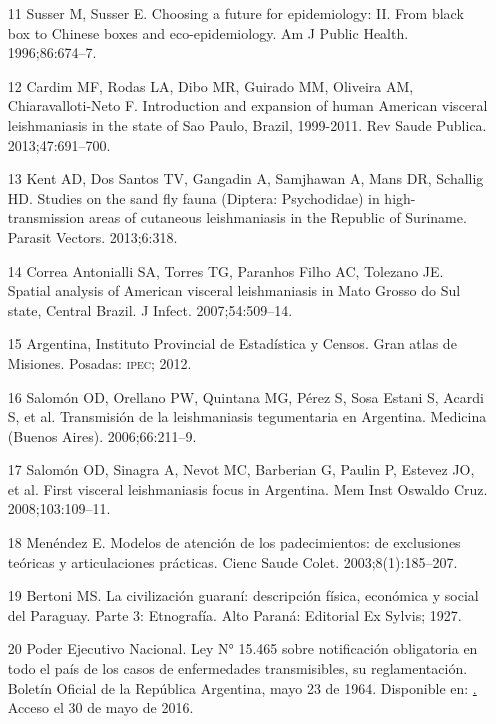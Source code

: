 \documentclass{article}
\begin{document}
\begin{itemize}
\item[11] Susser M, Susser E. Choosing a future for epidemiology: II. From
black box to Chinese boxes and eco-epidemiology. Am J Public Health.
1996;86:674–7.

\item[12] Cardim MF, Rodas LA, Dibo MR, Guirado MM, Oliveira AM,
Chiaravalloti-Neto F. Introduction and expansion of human American visceral
leishmaniasis in the state of Sao Paulo, Brazil, 1999-2011. Rev Saude Publica.
2013;47:691–700.

\item[13] Kent AD, Dos Santos TV, Gangadin A, Samjhawan A, Mans DR, Schallig
HD. Studies on the sand fly fauna (Diptera: Psychodidae) in high-transmission
areas of cutaneous leishmaniasis in the Republic of Suriname. Parasit Vectors.
2013;6:318.

\item[14] Correa Antonialli SA, Torres TG, Paranhos Filho AC, Tolezano JE.
Spatial analysis of American visceral leishmaniasis in Mato Grosso do Sul state,
Central Brazil. J Infect. 2007;54:509–14.

\item[15] Argentina, Instituto Provincial de Estadística y Censos. Gran atlas
de Misiones. Posadas: \textsc{ipec}; 2012.

\item[16] Salomón OD, Orellano PW, Quintana MG, Pérez S, Sosa Estani S,
Acardi S, et al. Transmisión de la leishmaniasis tegumentaria en Argentina.
Medicina (Buenos Aires). 2006;66:211–9.

\item[17] Salomón OD, Sinagra A, Nevot MC, Barberian G, Paulin P, Estevez JO,
et al. First visceral leishmaniasis focus in Argentina. Mem Inst Oswaldo Cruz.
2008;103:109–11.

\item[18] Menéndez E. Modelos de atención de los padecimientos: de
exclusiones teóricas y articulaciones prácticas. Cienc Saude Colet.
2003;8(1):185–207.

\item[19] Bertoni MS. La civilización guaraní: descripción física, económica
y social del Paraguay. Parte 3: Etnografía. Alto Paraná: Editorial Ex Sylvis;
1927.

\item[20] Poder Ejecutivo Nacional. Ley N° 15.465 sobre notificación
obligatoria en todo el país de los casos de enfermedades transmisibles, su
reglamentación. Boletín Oficial de la República Argentina, mayo 23 de 1964.
Disponible en: \href{https://www.boletinoficial.gob.ar/}. Acceso el 30 de mayo
de 2016.


\end{itemize}
\end{document}
